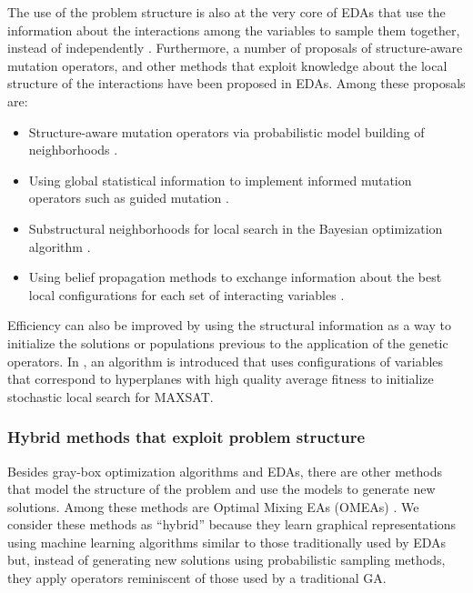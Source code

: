 \documentclass{article} %
\begin{document}
 
The use of the problem structure is also at the very core of EDAs that use the information about the interactions among the variables to sample them together, instead of independently \cite{Larranhaga_and_Lozano:2002}. Furthermore, a number of proposals of structure-aware mutation operators, and other methods that exploit knowledge about the local structure of the interactions have been proposed in EDAs. Among these proposals are:

\begin{itemize} 
 \item  Structure-aware mutation operators via probabilistic model building of neighborhoods \cite{Sastry_and_Goldberg:2004a}.
 \item Using global statistical information to implement informed mutation operators such as guided mutation \cite{Zhang_and_Sun:2006,Zhang_et_al:2005a}.
 \item  Substructural neighborhoods for local search in the Bayesian optimization algorithm \cite{Lima_et_al:2006,Luong_et_al:2010}.
 \item  Using  belief propagation methods to exchange information about the best local configurations for each set of interacting variables \cite{Lima_et_al:2009,Mendiburu_et_al:2007a,Mendiburu_et_al:2012}.  
 \end{itemize} 

   Efficiency can also be improved by using the structural information as a way to initialize the solutions or populations previous to the application of the genetic operators. In \cite{Hains_et_al:2013},  an algorithm is introduced that uses configurations of variables that correspond to hyperplanes with high quality average fitness to  initialize stochastic local search for MAXSAT.


\subsubsection{Hybrid methods that exploit problem structure}

  Besides gray-box optimization algorithms and EDAs, there are other methods that model the structure of the problem and use the models to generate new solutions. Among these methods are Optimal Mixing EAs (OMEAs) \cite{Thierens_and_Bosman:2011}. We consider these methods as ``hybrid'' because they learn graphical representations using machine learning algorithms similar to those traditionally used by EDAs but, instead of generating new solutions using probabilistic sampling methods, they apply operators reminiscent of those used by a traditional GA.
\end{document}
